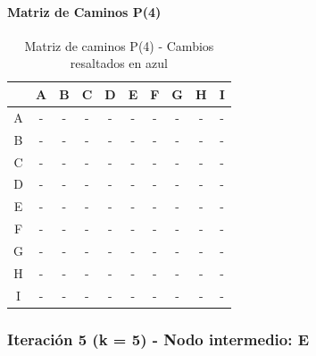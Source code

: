 \documentclass[12pt]{article}
\begin{document}
\paragraph{Matriz de Caminos P(4)}
\begin{table}[h!]
\centering
\begin{tabular}{|c|c|c|c|c|c|c|c|c|c|}
\hline
 & A & B & C & D & E & F & G & H & I \\\hline
A & - & - & - & - & - & - & - & - & - \\\hline
B & - & - & - & - & - & - & - & - & - \\\hline
C & - & - & - & - & - & - & - & - & - \\\hline
D & - & - & - & - & - & - & - & - & - \\\hline
E & - & - & - & - & - & - & - & - & - \\\hline
F & - & - & - & - & - & - & - & - & - \\\hline
G & - & - & - & - & - & - & - & - & - \\\hline
H & - & - & - & - & - & - & - & - & - \\\hline
I & - & - & - & - & - & - & - & - & - \\\hline
\end{tabular}
\caption{Matriz de caminos P(4) - Cambios resaltados en azul}
\end{table}

\subsubsection{Iteración 5 (k = 5) - Nodo intermedio: E}
\end{document}
